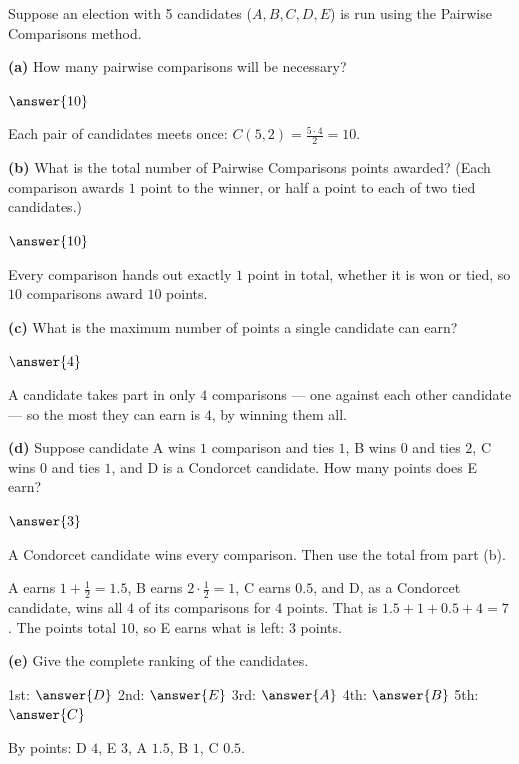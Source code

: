 \documentclass[12pt]{ximera}
\begin{document}
\begin{problem}
Suppose an election with 5 candidates ($A,B,C,D,E$) is run using the Pairwise Comparisons
method.

\begin{prompt}
\textbf{(a)} How many pairwise comparisons will be necessary?

$\answer{10}$

\begin{feedback}
Each pair of candidates meets once: $C(5,2)=\frac{5\cdot 4}{2}=10$.
\end{feedback}
\end{prompt}

\begin{prompt}
\textbf{(b)} What is the total number of Pairwise Comparisons points awarded? (Each
comparison awards $1$ point to the winner, or half a point to each of two tied
candidates.)

$\answer{10}$

\begin{feedback}
Every comparison hands out exactly $1$ point in total, whether it is won or tied, so
$10$ comparisons award $10$ points.
\end{feedback}
\end{prompt}

\begin{prompt}
\textbf{(c)} What is the maximum number of points a single candidate can earn?

$\answer{4}$

\begin{feedback}
A candidate takes part in only $4$ comparisons --- one against each other candidate
--- so the most they can earn is $4$, by winning them all.
\end{feedback}
\end{prompt}

\begin{prompt}
\textbf{(d)} Suppose candidate A wins $1$ comparison and ties $1$, B wins $0$ and ties $2$, C wins $0$ and
ties $1$, and D is a Condorcet candidate. How many points does E earn?

$\answer{3}$

\begin{hint}
A Condorcet candidate wins every comparison. Then use the total from part (b).
\end{hint}

\begin{feedback}
A earns $1+\frac12=1.5$, B earns $2\cdot\frac12=1$, C earns $0.5$, and D, as a Condorcet
candidate, wins all $4$ of its comparisons for $4$ points. That is $1.5+1+0.5+4=7$. The points total $10$, so E earns what is left: $3$ points.
\end{feedback}
\end{prompt}

\begin{prompt}
\textbf{(e)} Give the complete ranking of the candidates.

1st: $\answer{D}$ \quad 2nd: $\answer{E}$ \quad 3rd: $\answer{A}$ \quad 4th: $\answer{B}$ \quad 5th: $\answer{C}$

\begin{feedback}
By points: D $4$, E $3$, A $1.5$, B $1$, C $0.5$.
\end{feedback}
\end{prompt}
\end{problem}
\end{document}
